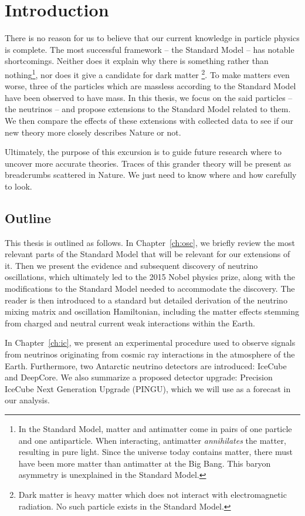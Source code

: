 \chapter{Introduction}
There is no reason for us to believe that our current knowledge in particle physics is complete.
The most successful framework -- the Standard Model -- has notable shortcomings. Neither does it
explain why there is something rather than nothing\footnote{In the Standard Model,
matter and antimatter come in pairs of one particle and one antiparticle. When interacting,
antimatter \emph{annihilates} the matter, resulting in pure light. Since the universe today contains matter,
there must have been more matter than antimatter at the Big Bang. This baryon asymmetry is unexplained in the Standard 
Model.}, nor does it give a candidate for dark matter
\footnote{Dark matter is heavy matter which does not interact with electromagnetic radiation.
No such particle exists in the Standard Model.}.
To make matters even worse, three of the particles which are massless according to the Standard Model have been observed to have mass.
In this thesis, we focus on the said particles -- the neutrinos -- and propose extensions to the Standard Model related to them. 
We then compare the effects of these extensions with collected data to see if our new theory more closely describes Nature or not. 

Ultimately, the purpose of this excursion is to guide future research where to uncover more accurate theories.
Traces of this grander theory will be present as breadcrumbs scattered in Nature. We just need to know where and how carefully to look. 

\section{Outline}
This thesis is outlined as follows. In Chapter~\ref{ch:osc}, we briefly review the most relevant parts of the Standard Model that will be relevant for our extensions of it.
Then we present the evidence and subsequent discovery of neutrino oscillations, which ultimately led to the 2015 Nobel physics prize, along with the modifications to the Standard Model needed to accommodate the discovery.
The reader is then introduced to a standard but detailed derivation of the neutrino mixing matrix and oscillation Hamiltonian, including the matter effects stemming from charged and neutral current weak interactions within the Earth.

In Chapter~\ref{ch:ic}, we present an experimental procedure used to observe signals from neutrinos originating from cosmic ray interactions in the atmosphere of the Earth. 
Furthermore, two Antarctic neutrino detectors are introduced: IceCube and DeepCore.
We also summarize a proposed detector upgrade: Precision IceCube Next Generation Upgrade (PINGU), which we will use as a forecast in our analysis.

